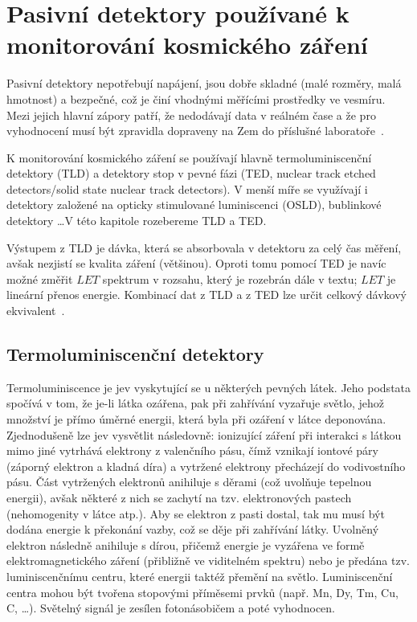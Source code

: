 \chapter{Pasivní detektory používané k monitorování kosmického záření}\label{sec:detektory_detektory}
Pasivní detektory nepotřebují napájení, jsou dobře skladné (malé rozměry, malá hmotnost) a bezpečné, což je činí vhodnými měřícími prostředky ve vesmíru. Mezi jejich hlavní zápory patří, že nedodávají data v reálném čase a že pro vyhodnocení musí být zpravidla dopraveny na Zem do příslušné laboratoře~\cite{benton}.

K monitorování kosmického záření se používají hlavně termoluminiscenční detektory (TLD) a detektory stop v pevné fázi (TED, nuclear track etched detectors/solid state nuclear track detectors). V menší míře se využívají i detektory založené na opticky stimulované luminiscenci (OSLD), bublinkové detektory \ldots V této kapitole rozebereme TLD a TED.

Výstupem z TLD je dávka, která se absorbovala v detektoru za celý čas měření, avšak nezjistí se kvalita záření (většinou). Oproti tomu pomocí TED je navíc možné změřit $\mathit{LET}$ spektrum v rozsahu, který je rozebrán dále v textu; $\mathit{LET}$ je lineární přenos energie. Kombinací dat z TLD a z TED lze určit celkový dávkový ekvivalent~\cite{benton}.
\section{Termoluminiscenční detektory}\label{sec:detektory_TLD}
Termoluminiscence je jev vyskytující se u některých pevných látek. Jeho podstata spočívá v tom, že je-li látka ozářena, pak při zahřívání vyzařuje světlo, jehož množství je přímo úměrné energii, která byla při ozáření v látce deponována. Zjednodušeně lze jev vysvětlit následovně: ionizující záření při interakci s látkou mimo jiné vytrhává elektrony z valenčního pásu, čímž vznikají iontové páry (záporný elektron a kladná díra) a vytržené elektrony přecházejí do vodivostního pásu. Část vytržených elektronů anihiluje s děrami (což uvolňuje tepelnou energii), avšak některé z nich se zachytí na tzv. elektronových pastech (nehomogenity v látce atp.). Aby se elektron z pasti dostal, tak mu musí být dodána energie k překonání vazby, což se děje při zahřívání látky. Uvolněný elektron následně
anihiluje s dírou, přičemž energie je vyzářena ve formě elektromagnetického záření (přibližně ve viditelném spektru) nebo je předána tzv. luminiscenčnímu centru, které energii taktéž přemění na světlo. Luminiscenční centra mohou být tvořena stopovými příměsemi prvků (např. Mn, Dy, Tm, Cu, C, \ldots). Světelný signál je zesílen fotonásobičem a poté vyhodnocen. 

